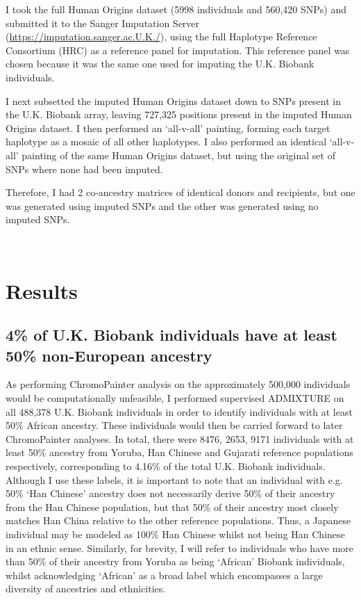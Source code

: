 I took the full Human Origins dataset (5998 individuals and 560,420 SNPs) and submitted it to the Sanger Imputation Server (\url{https://imputation.sanger.ac.U.K./}), using the full Haplotype Reference Consortium (HRC) as a reference panel for imputation. This reference panel was chosen because it was the same one used for imputing the U.K. Biobank individuals.

I next subsetted the imputed Human Origins dataset down to SNPs present in the U.K. Biobank array, leaving 727,325 positions present in the imputed Human Origins dataset. I then performed an `all-v-all' painting, forming each target haplotype as a mosaic of all other haplotypes. I also performed an identical `all-v-all' painting of the same Human Origins dataset, but using the original set of SNPs where none had been imputed. 

Therefore, I had 2 co-ancestry matrices of identical donors and recipients, but one was generated using imputed SNPs and the other was generated using no imputed SNPs. 

\

\section{Results}

\subsection{4\% of U.K. Biobank individuals have at least 50\% non-European ancestry}

As performing ChromoPainter analysis on the approximately 500,000 individuals would be computationally unfeasible, I performed supervised ADMIXTURE on all 488,378 U.K. Biobank individuals in order to identify individuals with at least 50\% African ancestry. These individuals would then be carried forward to later ChromoPainter analyses. In total, there were 8476, 2653, 9171 individuals with at least 50\% ancestry from Yoruba, Han Chinese and Gujarati reference populations respectively, corresponding to 4.16\% of the total U.K. Biobank individuals. Although I use these labels, it is important to note that an individual with e.g. 50\% `Han Chinese' ancestry does not necessarily derive 50\% of their ancestry from the Han Chinese population, but that 50\% of their ancestry most closely matches Han China relative to the other reference populations. Thus, a Japanese individual may be modeled as 100\% Han Chinese whilst not being Han Chinese in an ethnic sense. Similarly, for brevity, I will refer to individuals who have more than 50\% of their ancestry from Yoruba as being `African' Biobank individuals, whilst acknowledging `African' as a broad label which encompasses a large diversity of ancestries and ethnicities.  

